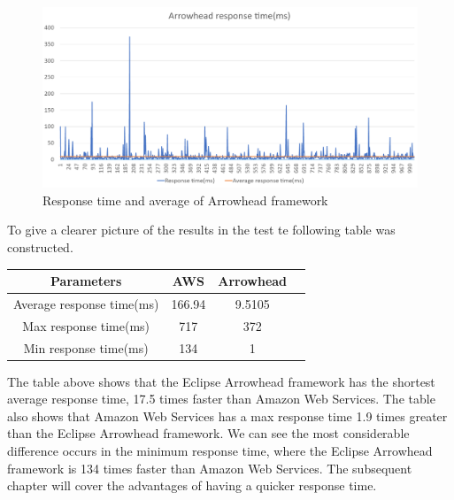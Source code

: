 \begin{figure}[h!]
    \centering
    \includegraphics[width=\textwidth]{Pictures/AH_response_time.png} 
    \caption{Response time and average of Arrowhead framework}
    \label{AH response time}
\end{figure}

To give a clearer picture of the results in the test te following table was constructed. 
\begin{center}
    \begin{tabular}{||c|c|c|c||}
        \hline
        Parameters & AWS & Arrowhead \\
        \hline\hline
        Average response time(ms) & 166.94 & 9.5105 \\
        Max response time(ms) & 717 & 372 \\
        Min response time(ms) & 134 & 1 \\
        \hline
    \end{tabular}
\end{center}
The table above shows that the Eclipse Arrowhead framework has the shortest average response time, 17.5 times faster than Amazon Web Services. 
The table also shows that Amazon Web Services has a max response time  1.9 times greater than the Eclipse Arrowhead framework.
We can see the most considerable difference occurs in the minimum response time, where the Eclipse Arrowhead framework is 134 times faster than Amazon Web Services.
The subsequent chapter will cover the advantages of having a quicker response time.


